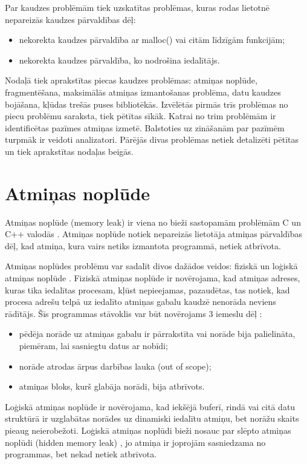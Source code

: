 ﻿ \label{sec:problems}
Par kaudzes problēmām tiek uzskatītas problēmas, kuras rodas lietotnē nepareizās kaudzes pārvaldības dēļ: 
\begin{itemize}
\item nekorekta kaudzes pārvaldība ar malloc() vai citām līdzīgām funkcijām;
\item nekorekta kaudzes pārvaldība, ko nodrošina iedalītājs.
\end{itemize}

Nodaļā tiek aprakstītas piecas kaudzes problēmas: atmiņas noplūde, fragmentēšana, maksimālās atmiņas izmantošanas problēma, datu kaudzes bojāšana, kļūdas trešās puses bibliotēkās.
Izvēlētās pirmās trīs problēmas no piecu problēmu saraksta, tiek pētītas sīkāk. 
Katrai no trim problēmām ir identificētas pazīmes atmiņas izmetē.
Balstoties uz zināšanām par pazīmēm turpmāk ir veidoti analizatori.
Pārējās divas problēmas netiek detalizēti pētītas un tiek aprakstītas nodaļas beigās.

\section{Atmiņas noplūde}

Atmiņas noplūde (memory leak) ir viena no bieži sastopamām problēmām C un C++ valodās \cite{GNED}.
Atmiņas noplūde notiek nepareizās lietotāja atmiņas pārvaldības dēļ, kad atmiņa, kura vairs netiks izmantota programmā, netiek atbrīvota.

Atmiņas noplūdes problēmu var sadalīt divos dažādos veidos: fiziskā un loģiskā atmiņas noplūde \cite{JMMR}.
Fiziskā atmiņas noplūde ir novērojama, kad atmiņas adreses, kuras tika iedalītas procesam,  kļūst nepieejamas, pazaudētas, tas notiek, kad procesa adrešu telpā uz iedalīto atmiņas gabalu kaudzē nenorāda neviens rādītājs.
Šīs programmas stāvoklis var būt novērojams 3 iemeslu dēļ \cite{JMMR}:
\begin{itemize}
\item pēdēja norāde uz atmiņas gabalu ir pārrakstīta vai norāde bija palielināta, piemēram, lai sasniegtu datus ar nobīdi;
\item norāde atrodas ārpus darbības lauka (out of scope);
\item atmiņas bloks, kurš glabāja norādi, bija atbrīvots.
\end{itemize}

Loģiskā atmiņas noplūde ir novērojama, kad iekšējā buferī, rindā vai citā datu struktūrā ir uzglabātas norādes uz dinamiski iedalītu atmiņu, bet norāžu skaits pieaug neierobežoti.
Loģiskā atmiņas noplūdi bieži nosauc par slēpto atmiņas noplūdi (hidden memory leak) \cite{RRUU}, jo atmiņa ir joprojām sasniedzama no programmas, bet nekad netiek atbrīvota.

